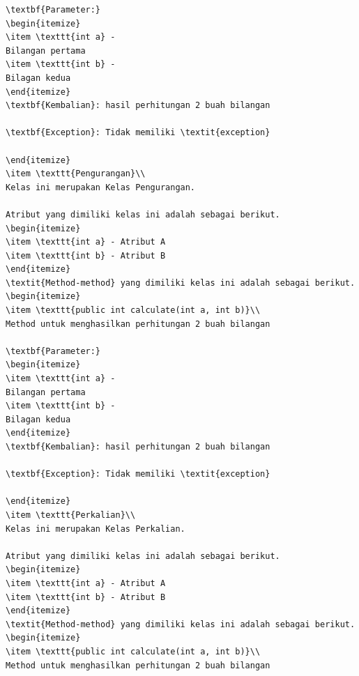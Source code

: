\documentclass[a4paper,twoside]{article}
\begin{document}
\begin{enumerate}
\begin{lstlisting}[caption=Hasil Pengujian Pertama]
\textbf{Parameter:}
\begin{itemize}
\item \texttt{int a} - 
Bilangan pertama
\item \texttt{int b} - 
Bilagan kedua
\end{itemize}
\textbf{Kembalian}: hasil perhitungan 2 buah bilangan

\textbf{Exception}: Tidak memiliki \textit{exception}

\end{itemize}
\item \texttt{Pengurangan}\\ 
Kelas ini merupakan Kelas Pengurangan.

Atribut yang dimiliki kelas ini adalah sebagai berikut.
\begin{itemize}
\item \texttt{int a} - Atribut A
\item \texttt{int b} - Atribut B
\end{itemize}
\textit{Method-method} yang dimiliki kelas ini adalah sebagai berikut.
\begin{itemize}
\item \texttt{public int calculate(int a, int b)}\\ 
Method untuk menghasilkan perhitungan 2 buah bilangan

\textbf{Parameter:}
\begin{itemize}
\item \texttt{int a} - 
Bilangan pertama
\item \texttt{int b} - 
Bilagan kedua
\end{itemize}
\textbf{Kembalian}: hasil perhitungan 2 buah bilangan

\textbf{Exception}: Tidak memiliki \textit{exception}

\end{itemize}
\item \texttt{Perkalian}\\ 
Kelas ini merupakan Kelas Perkalian.

Atribut yang dimiliki kelas ini adalah sebagai berikut.
\begin{itemize}
\item \texttt{int a} - Atribut A
\item \texttt{int b} - Atribut B
\end{itemize}
\textit{Method-method} yang dimiliki kelas ini adalah sebagai berikut.
\begin{itemize}
\item \texttt{public int calculate(int a, int b)}\\ 
Method untuk menghasilkan perhitungan 2 buah bilangan


\end{lstlisting}
\end{enumerate}
\end{document}
